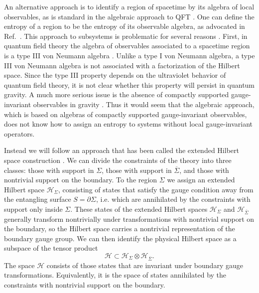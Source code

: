 \documentclass[a4paper,11pt]{article}
\begin{document}
An alternative approach is to identify a region of spacetime by its algebra of local observables, as is standard in the algebraic approach to QFT \cite{Haag1992}.
One can define the entropy of a region to be the entropy of its observable algebra, as advocated in Ref.~\cite{Casini:2013rba}.
This approach to subsystems is problematic for several reasons \cite{Giddings:2015lla}.
First, in quantum field theory the algebra of observables associated to a spacetime region is a type III von Neumann algebra \cite{Yngvason2005}. 
Unlike a type I von Neumann algebra, a type III von Neumann algebra is not associated with a factorization of the Hilbert space.
Since the type III property depends on the ultraviolet behavior of quantum field theory, it is not clear whether this property will persist in quantum gravity.
A much more serious issue is the absence of compactly supported gauge-invariant observables in gravity \cite{Giddings:2005id}.
Thus it would seem that the algebraic approach, which is based on algebras of compactly supported gauge-invariant observables, does not know how to assign an entropy to systems without local gauge-invariant operators.

Instead we will follow an approach that has been called the extended Hilbert space construction \cite{Buividovich:2008gq,Donnelly2011,Ghosh:2015iwa,Aoki:2015bsa,Soni:2015yga}.
We can divide the constraints of the theory into three classes: those with support in $\Sigma$, those with support in $\overline \Sigma$, and those with nontrivial support on the boundary.
To the region $\Sigma$ we assign an extended Hilbert space $\mathcal{H}_\Sigma$, consisting of states that satisfy the gauge condition away from the entangling surface $S = \partial \Sigma$, i.e. which are annihilated by the constraints with support only inside $\Sigma$.
These states of the extended Hilbert spaces $\mathcal{H}_\Sigma$ and $\mathcal{H}_{\overline{\Sigma}}$ generally transform nontrivially under transformations with nontrivial support on the boundary, so the Hilbert space carries a nontrivial representation of the boundary gauge group.
We can then identify the physical Hilbert space as a subspace of the tensor product 
\begin{equation} \label{embedding}
\mathcal{H} \subset \mathcal{H}_\Sigma \otimes \mathcal{H}_{\overline \Sigma}.
\end{equation}
The space $\mathcal{H}$ consists of those states that are invariant under boundary gauge transformations.
Equivalently, it is the space of states annihilated by the constraints with nontrivial support on the boundary.
\end{document}
